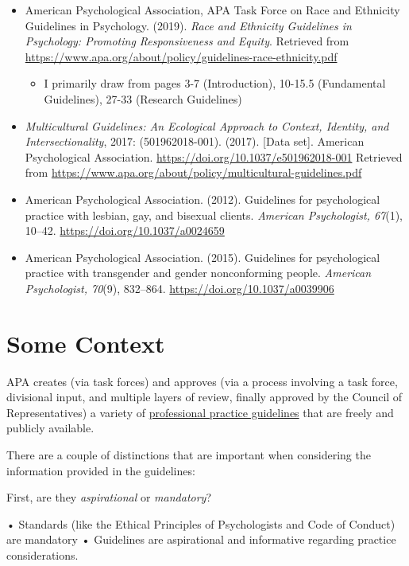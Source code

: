 \documentclass[
  english,
]{book}
\providecommand{\tightlist}{%
  \setlength{\itemsep}{0pt}\setlength{\parskip}{0pt}}
\begin{document}
\begin{itemize}
\tightlist
\item
  American Psychological Association, APA Task Force on Race and Ethnicity Guidelines in Psychology. (2019). \emph{Race and Ethnicity Guidelines in Psychology: Promoting Responsiveness and Equity}. Retrieved from \url{https://www.apa.org/about/policy/guidelines-race-ethnicity.pdf}

  \begin{itemize}
  \tightlist
  \item
    I primarily draw from pages 3-7 (Introduction), 10-15.5 (Fundamental Guidelines), 27-33 (Research Guidelines)
  \end{itemize}
\item
  \emph{Multicultural Guidelines: An Ecological Approach to Context, Identity, and Intersectionality}, 2017: (501962018-001). (2017). {[}Data set{]}. American Psychological Association. \url{https://doi.org/10.1037/e501962018-001} Retrieved from \url{https://www.apa.org/about/policy/multicultural-guidelines.pdf}
\item
  American Psychological Association. (2012). Guidelines for psychological practice with lesbian, gay, and bisexual clients. \emph{American Psychologist, 67}(1), 10--42. \url{https://doi.org/10.1037/a0024659}
\item
  American Psychological Association. (2015). Guidelines for psychological practice with transgender and gender nonconforming people. \emph{American Psychologist, 70}(9), 832--864. \url{https://doi.org/10.1037/a0039906}
\end{itemize}

\hypertarget{some-context}{%
\section{Some Context}\label{some-context}}

APA creates (via task forces) and approves (via a process involving a task force, divisional input, and multiple layers of review, finally approved by the Council of Representatives) a variety of \href{https://www.apa.org/practice/guidelines}{professional practice guidelines} that are freely and publicly available.

There are a couple of distinctions that are important when considering the information provided in the guidelines:

First, are they \emph{aspirational} or \emph{mandatory}?

• Standards (like the Ethical Principles of Psychologists and Code of Conduct) are mandatory
• Guidelines are aspirational and informative regarding practice considerations.
\end{document}
